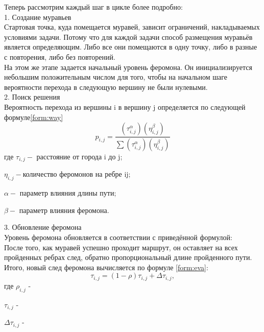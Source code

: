 \documentclass[a4paper, 14pt]{article}
\begin{document}
Теперь рассмотрим каждый шаг в цикле более подробно:\\

1. Создание муравьев\\
   Стартовая точка, куда помещается муравей, зависит ограничений,   накладываемых условиями задачи. Потому что для каждой задачи   способ размещения муравьёв является определяющим. Либо все    они помещаются в одну точку, либо в разные с повторения, либо    без повторений. \\
  На этом же этапе задается начальный уровень феромона. Он    инициализируется небольшим положительным числом для того,    чтобы на начальном шаге вероятности перехода в следующую    вершину не были нулевыми. \\
  
2. Поиск решения  \\
 Вероятность перехода из вершины i в вершину j определяется по следующей формуле\ref{form:way}\\   
\begin{equation}\label{form:way} 
 p_{i,j}={\frac {(\tau _{i,j}^{\alpha })(\eta _{i,j}^{\beta })}{\sum (\tau _{i,j}^{\alpha })(\eta _{i,j}^{\beta })}}
 \end{equation}
    где \quad$ \tau _{i,j} - $ расстояние от города i до j;
    
         $\eta _{i,j} - $количество феромонов на ребре ij;
         
          $\alpha - $ параметр влияния длины пути;
          
          $\beta - $ параметр влияния феромона.


3. Обновление феромона \\
  Уровень феромона обновляется в соответствии с приведённой формулой:\\
После того, как муравей успешно проходит маршрут, он оставляет на всех пройденных ребрах след, обратно пропорциональный длине пройденного пути. Итого, новый след феромона вычисляется по формуле \ref{form:eva}:
\begin{equation}\label{form:eva} 
    \tau _{i,j}=(1-\rho )\tau _{i,j}+\Delta \tau _{i,j},
\end{equation}
где \quad$ \rho _{i,j}$ -  

    $\tau _{i,j}$ -  
    
    $\Delta \tau _{i,j}$ - 
\end{document}

